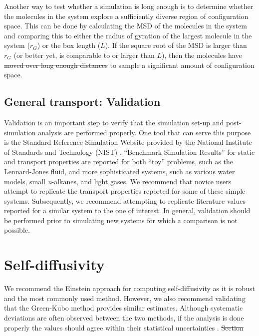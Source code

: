 \documentclass[9pt,bestpractices]{livecoms}
\providecommand{\DIFadd}[1]{{\protect\color{blue}\uwave{#1}}} %
\providecommand{\DIFdel}[1]{{\protect\color{red}\sout{#1}}}                      %
\providecommand{\DIFaddbegin}{} %
\providecommand{\DIFaddend}{} %
\providecommand{\DIFdelbegin}{} %
\providecommand{\DIFdelend}{} %
\begin{document}
\DIFaddend Another way to test whether a simulation is long enough is to determine whether the molecules in the system explore a sufficiently diverse region of configuration space. This can be done by calculating the MSD of the molecules in the system and comparing this to either the radius of gyration of the largest molecule in the system (\DIFdelbegin \DIFdel{$r_G$}\DIFdelend \DIFaddbegin \DIFadd{$r_{\rm G}$}\DIFaddend ) or the box length ($L$). If the square root of the MSD is larger than \DIFdelbegin \DIFdel{$r_G$ }\DIFdelend \DIFaddbegin \DIFadd{$r_{\rm G}$ }\DIFaddend (or better yet, is comparable to or larger than $L$), then the molecules have \DIFdelbegin \DIFdel{moved over long enough distances }\DIFdelend \DIFaddbegin \DIFadd{traversed far enough }\DIFaddend to sample a significant amount of configuration space.


\subsection{General transport: Validation} \label{sec:General: Validation}

Validation is an important step to verify that the simulation set-up and post-simulation analysis are performed properly. One tool that can serve this purpose is the Standard Reference Simulation Website provided by the National Institute of Standards and Technology (NIST) \cite{ShenSRSW}. ``Benchmark Simulation Results'' for static and transport properties are reported for both ``toy'' problems, such as the Lennard-Jones fluid, and more sophisticated systems, such as various water models, small \textit{n}-alkanes, and light gases. We recommend that novice users attempt to replicate the transport properties reported for some of these simple systems. Subsequently, we recommend attempting to replicate literature values reported for a similar system to the one of interest. In general, validation should be performed prior to simulating new systems for which a comparison is not possible.

\section{Self-diffusivity} \label{sec:Self-Diffusivity}

We recommend the Einstein approach for computing self-diffusivity as it is robust and the most commonly used method. However, we also recommend validating that the Green-Kubo method provides similar estimates. Although systematic deviations are often observed between the two methods, if the analysis is done properly the values should agree within their statistical uncertainties \cite{Kondratyuk2016,Liu2012,Mondello1997}. 
\DIFdelbegin \DIFdel{Section }\DIFdelend \DIFaddbegin 
\end{document}
